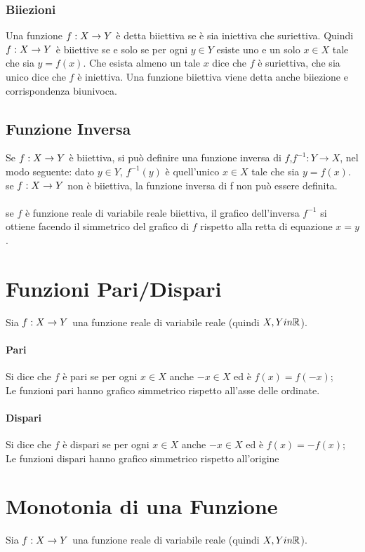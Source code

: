 \documentclass[12pt, a4paper, openany]{book}
\begin{document}
\subsubsection{Biiezioni}
Una funzione $f: X \rightarrow Y$ è detta biiettiva se è sia iniettiva che suriettiva.
Quindi $f: X \rightarrow Y$ è biiettive se e solo se per ogni $y \in Y$ esiste uno e un solo $x \in X$ tale che sia $y = f(x)$.
Che esista almeno un tale $x$ dice che $f$ è suriettiva, che sia unico dice che $f$ è iniettiva.
Una funzione biiettiva viene detta anche biiezione e corrispondenza biunivoca.

\subsection*{Funzione Inversa}
Se $f: X \rightarrow Y$ è biiettiva, si può definire una funzione inversa di $f$,$f^{-1} : Y \rightarrow X$, nel modo seguente:
dato $y \in Y$, $f^{-1}(y)$ è quell'unico $x \in X$ tale che sia $y = f(x)$.
se $f: X \rightarrow Y$ non è biiettiva, la funzione inversa di f non può essere definita.
\paragraph*{} se $f$ è funzione reale di variabile reale biiettiva, il grafico dell'inversa $f^{-1}$ si ottiene facendo il simmetrico del grafico di $f$ rispetto alla retta di equazione $x=y$.

\section*{Funzioni Pari/Dispari}
Sia $f: X \rightarrow Y$ una funzione reale di variabile reale (quindi $X, Y in \mathbb{R}$).
\paragraph*{Pari}
Si dice che $f$ è pari se per ogni $x \in X$ anche $-x \in X$ ed è $f(x) = f(-x)$;
\\Le funzioni pari hanno grafico simmetrico rispetto all'asse delle ordinate.
\paragraph*{Dispari}
Si dice che $f$ è dispari se per ogni $x \in X$ anche $-x \in X$ ed è $f(x) = -f(x)$;
\\Le funzioni dispari hanno grafico simmetrico rispetto all'origine

\section{Monotonia di una Funzione}
Sia $f: X \rightarrow Y$ una funzione reale di variabile reale (quindi $X, Y in \mathbb{R}$).
\end{document}
